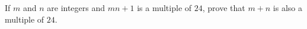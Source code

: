 If $m$ and $n$ are integers and $mn+1$ is a multiple of $24$, prove that $m+n$ is also a multiple of $24$.
